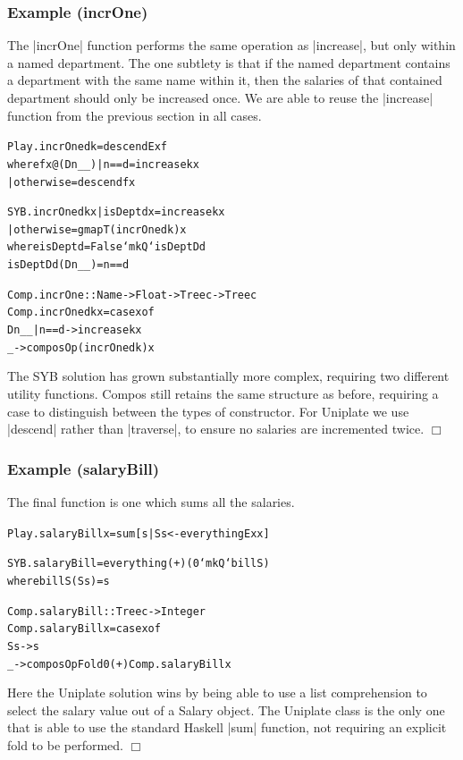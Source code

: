 \documentclass[preprint]{sigplanconf}
\newcommand{\noexample}{\hfill$\Box$}
\newenvironment{code}{\begin{alltt}\small}{\end{alltt}}
\newenvironment{examplename}[1]{\subsubsection*{Example (#1)}}{\noexample}
\begin{document}
\begin{examplename}{incrOne}

The |incrOne| function performs the same operation as |increase|, but only within a named department. The one subtlety is that if the named department contains a department with the same name within it, then the salaries of that contained department should only be increased once. We are able to reuse the |increase| function from the previous section in all cases.

\begin{code}
Play.incrOne d k = descendEx f
    where f x@(D n _ _)  | n == d     = increase k x
                         | otherwise  = descend f x

SYB.incrOne d k x  | isDept d x  = increase k x
                   | otherwise   = gmapT (incrOne d k) x
    where  isDept   d = False `mkQ` isDeptD d
           isDeptD  d (D n _ _) = n == d

Comp.incrOne :: Name -> Float -> Tree c -> Tree c
Comp.incrOne d k x = case x of
    D n _ _ | n == d -> increase k x
    _ -> composOp (incrOne d k) x
\end{code}

The SYB solution has grown substantially more complex, requiring two different utility functions. Compos still retains the same structure as before, requiring a case to distinguish between the types of constructor. For Uniplate we use |descend| rather than |traverse|, to ensure no salaries are incremented twice.
\end{examplename}

\begin{examplename}{salaryBill}

The final function is one which sums all the salaries.

\begin{code}
Play.salaryBill x = sum [s | S s <- everythingEx x]

SYB.salaryBill = everything (+) (0 `mkQ` billS)
   where billS (S s) = s

Comp.salaryBill :: Tree c -> Integer
Comp.salaryBill x = case x of
    S s -> s
    _ -> composOpFold 0 (+) Comp.salaryBill x
\end{code}

Here the Uniplate solution wins by being able to use a list comprehension to select the salary value out of a Salary object. The Uniplate class is the only one that is able to use the standard Haskell |sum| function, not requiring an explicit fold to be performed.
\end{examplename}
\end{document}
